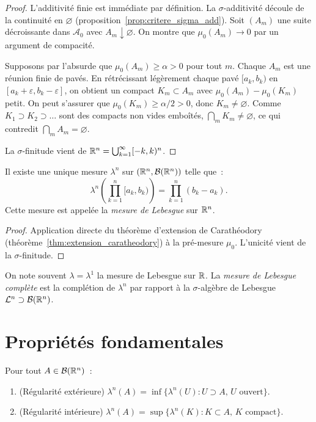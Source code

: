 \begin{proof}
L'additivit\'e finie est imm\'ediate par d\'efinition. La $\sigma$-additivit\'e
d\'ecoule de la continuit\'e en $\varnothing$ (proposition~\ref{prop:critere_sigma_add}).
Soit $(A_m)$ une suite d\'ecroissante dans $\mathcal{A}_0$ avec $A_m \downarrow
\varnothing$. On montre que $\mu_0(A_m) \to 0$ par un argument de compacit\'e.

Supposons par l'absurde que $\mu_0(A_m) \geq \alpha > 0$ pour tout $m$. Chaque
$A_m$ est une r\'eunion finie de pav\'es. En r\'etr\'ecissant l\'eg\`erement chaque
pav\'e $[a_k, b_k)$ en $[a_k + \varepsilon, b_k - \varepsilon]$, on obtient un
compact $K_m \subset A_m$ avec $\mu_0(A_m) - \mu_0(K_m)$ petit. On peut s'assurer
que $\mu_0(K_m) \geq \alpha/2 > 0$, donc $K_m \neq \varnothing$. Comme
$K_1 \supset K_2 \supset \ldots$ sont des compacts non vides embo\^it\'es,
$\bigcap_m K_m \neq \varnothing$, ce qui contredit $\bigcap_m A_m = \varnothing$.

La $\sigma$-finitude vient de $\mathbb{R}^n = \bigcup_{k=1}^{\infty} [-k, k)^n$.
\end{proof}

\begin{theoreme}
\label{thm:mesure_lebesgue}
Il existe une unique mesure $\lambda^n$ sur $(\mathbb{R}^n, \mathcal{B}(\mathbb{R}^n))$ telle que~:
\[
\lambda^n\!\left(\prod_{k=1}^n [a_k, b_k)\right) = \prod_{k=1}^n (b_k - a_k).
\]
Cette mesure est appel\'ee la \emph{mesure de Lebesgue} sur $\mathbb{R}^n$.
\end{theoreme}

\begin{proof}
Application directe du th\'eor\`eme d'extension de Carath\'eodory
(th\'eor\`eme~\ref{thm:extension_caratheodory}) \`a la pr\'e-mesure $\mu_0$. L'unicit\'e
vient de la $\sigma$-finitude.
\end{proof}

\begin{remarque}
On note souvent $\lambda = \lambda^1$ la mesure de Lebesgue sur $\mathbb{R}$.
La \emph{mesure de Lebesgue compl\`ete} est la compl\'etion de $\lambda^n$ par
rapport \`a la $\sigma$-alg\`ebre de Lebesgue $\mathcal{L}^n \supset
\mathcal{B}(\mathbb{R}^n)$.
\end{remarque}

\section{Propri\'et\'es fondamentales}

\begin{theoreme}[R\'egularit\'e]
\label{thm:regularite_lebesgue}
Pour tout $A \in \mathcal{B}(\mathbb{R}^n)$~:
\begin{enumerate}
    \item (R\'egularit\'e ext\'erieure) $\lambda^n(A) = \inf\{\lambda^n(U) :
    U \supset A,\, U \text{ ouvert}\}$.
    \item (R\'egularit\'e int\'erieure) $\lambda^n(A) = \sup\{\lambda^n(K) :
    K \subset A,\, K \text{ compact}\}$.
\end{enumerate}
\end{theoreme}

